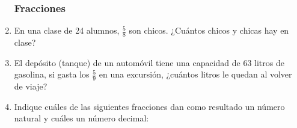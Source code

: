 \documentclass[letterpaper,11pt,twoside]{article}
\begin{document}
\begin{enumerate}
\subsubsection*{Fracciones}
\item En una clase de 24 alumnos, $\frac{5}{8}$ son chicos. ¿Cuántos chicos y chicas hay en clase?
\item El depósito (tanque) de un autom\'{o}vil tiene una capacidad de 63 litros de gasolina, si gasta los $\frac{5}{9}$ en una excursi\'{o}n, ¿cu\'{a}ntos litros le quedan al volver de viaje?
\item Indique cu\'{a}les de las siguientes fracciones dan como resultado un n\'{u}mero natural y cu\'{a}les un n\'{u}mero decimal:
\begin{enumerate}
\end{enumerate}

\end{enumerate}
\end{document}
